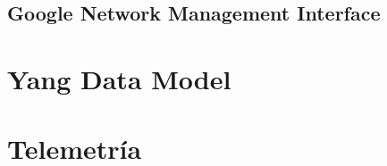 
\subsection{Google Network Management Interface\label{sec:gNMI}}

\section{Yang Data Model}


\section{Telemetría}

